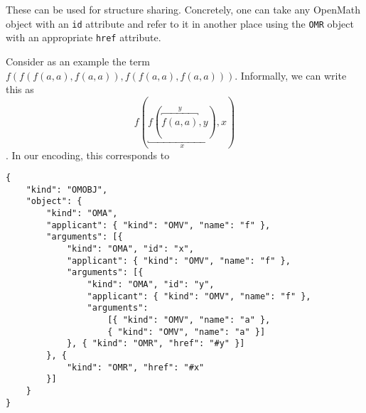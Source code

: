 These can be used for structure sharing. 
Concretely, one can take any OpenMath object with an \texttt{id} attribute and refer to it in another place using the \texttt{OMR} object with an appropriate \texttt{href} attribute. 

Consider as an example the term $f(f(f(a, a), f(a, a)), f(f(a, a), f(a, a)))$. 
Informally, we can write this as $$f(\underbracket {f(\overbracket {f(a, a)}^y, y)}_x, x)$$. 
In our encoding, this corresponds to
\\\begin{minipage}{\linewidth}
\begin{lstlisting}
{
    "kind": "OMOBJ",
    "object": {
        "kind": "OMA",
        "applicant": { "kind": "OMV", "name": "f" },
        "arguments": [{ 
            "kind": "OMA", "id": "x",
            "applicant": { "kind": "OMV", "name": "f" },
            "arguments": [{
                "kind": "OMA", "id": "y",
                "applicant": { "kind": "OMV", "name": "f" },
                "arguments": 
                    [{ "kind": "OMV", "name": "a" },
                    { "kind": "OMV", "name": "a" }]
            }, { "kind": "OMR", "href": "#y" }]
        }, {
            "kind": "OMR", "href": "#x" 
        }]
    }
}
\end{lstlisting}\end{minipage}




